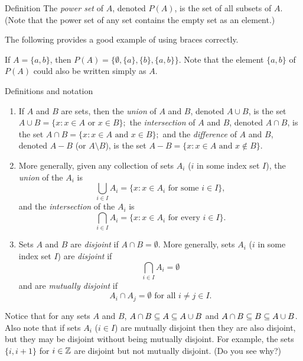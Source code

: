 \begin{df}{Definition} The \textit{power set} of $A$, denoted $P(A)$, is the set of
all subsets of $A$. (Note that the power set of any set
contains the empty set as an element.)\end{df}


The following provides a good example of using braces correctly.

\begin{example}{} If $A=\{a,b\}$, then $P(A)=\{\emptyset, \{a\}, \{b\}, \{a,b\}\}$.  Note that the element $\{a,b\}$ of $P(A)$ could also be written simply as $A$. \end{example}

\begin{df}{Definitions and notation}\

\begin{enumerate}
\item If $A$ and $B$ are sets, then the \textit{union} of $A$ and $B$, denoted $A\cup B$, is the set
$A\cup B=\{x: x\in A \mbox{ or } x\in B\};$ the \textit{intersection} of $A$ and $B$, denoted $A\cap B$, is the set
$A\cap B=\{x: x\in A \mbox{ and } x\in B\};$ and the \textit{difference} of $A$ and $B$, denoted $A-B$ (or $A\setminus B$), is the set
$A-B=\{x: x\in A \mbox{ and } x\not\in B\}.$

\item More generally, given any collection of sets $A_i$ ($i$ in some index set $I$), the \textit{union} of the $A_i$ is
$$\bigcup_{i\in I}A_i=\{x: x\in A_i \mbox{ for some } i\in I\},$$ and the \textit{intersection} of the $A_i$ is
$$\bigcap_{i\in I}A_i=\{x: x\in A_i \mbox{ for every } i\in I\}.$$

\item Sets $A$ and $B$ are \textit{disjoint} if $A\cap B=\emptyset$.  More generally, sets $A_i$ ($i$ in some index set $I$) are
\textit{disjoint} if $$\bigcap_{i\in I}A_i=\emptyset$$ and are {\it mutually disjoint} if $$A_i\cap A_j=\emptyset \mbox{ for all }i\neq j \in I.$$
\end{enumerate}
\end{df}

Notice that for any sets $A$ and $B$, $A\cap B \subseteq A \subseteq A\cup B$ and
$A\cap B \subseteq B \subseteq A\cup B$. Also note that if sets $A_i$ ($i \in I$) are mutually disjoint then they are also disjoint, but they may be disjoint without being mutually disjoint. For example, the sets $\{i, i+1\}$ for $i\in \mathbb{Z}$ are disjoint but not mutually disjoint. (Do you see why?)


